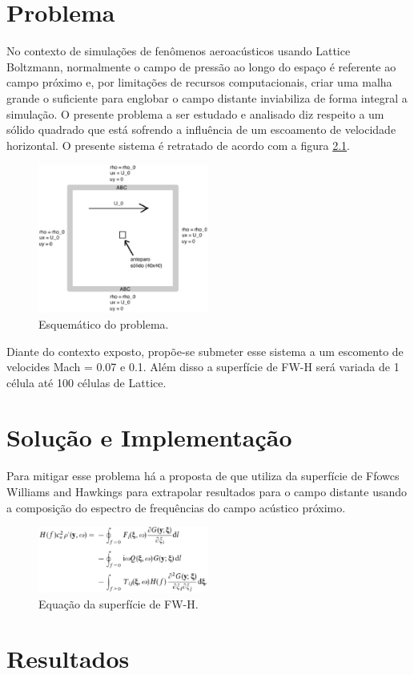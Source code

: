 \chapter{Problema}

No contexto de simulações de fenômenos aeroacústicos usando Lattice Boltzmann, normalmente o campo de pressão ao longo do espaço é referente ao campo próximo e, por limitações de recursos computacionais, criar uma malha grande o suficiente para englobar o campo distante inviabiliza de forma integral a simulação. O presente problema a ser estudado e analisado diz respeito a um sólido quadrado que está sofrendo a influência de um escoamento de velocidade horizontal. O presente sistema é retratado de acordo com a figura \ref{fig1}.

\begin{figure}[h!]
    \centering
    \hspace{-1.cm}
    \label{fig1}
    \includegraphics[width=0.5\textwidth]{../figuras/l5_1.eps}
    \caption{Esquemático do problema.}
\end{figure}

Diante do contexto exposto, propõe-se submeter esse sistema a um escomento de velocides Mach = 0.07 e 0.1. Além disso a superfície de FW-H será variada de 1 célula até 100 células de Lattice.

\chapter{Solução e Implementação}

Para mitigar esse problema há a proposta de \cite{lockard} que utiliza da superfície de Ffowcs Williams and Hawkings para extrapolar resultados para o campo distante usando a composição do espectro de frequências do campo acústico próximo.



\begin{figure}[h!]
    \centering
    \hspace{-1.cm}
    \label{fig1}
    \includegraphics[width=0.5\textwidth]{../figuras/l5_2.eps}
    \caption{Equação da superfície de FW-H.}
\end{figure}

\chapter{Resultados}

